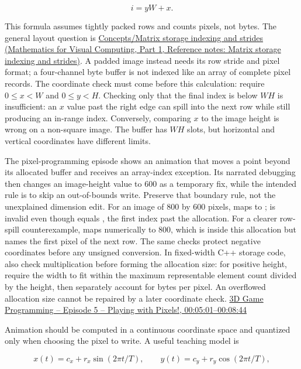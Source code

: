 \[
i=yW+x.
\]

This formula assumes tightly packed rows and counts pixels, not bytes. The general layout question is \href{../02-Mathematics-for-Visual-Computing-P01/main.pdf\#nameddest=appendix-ffdc1d4e5350}{Concepts/Matrix storage indexing and strides (Mathematics for Visual Computing, Part 1, Reference notes: Matrix storage indexing and strides)}. A padded image instead needs its row stride and pixel format; a four-channel byte buffer is not indexed like an array of complete pixel records. The coordinate check must come before this calculation: require \(0\le x<W\) and \(0\le y<H\). Checking only that the final index is below \(WH\) is insufficient: an \(x\) value past the right edge can spill into the next row while still producing an in-range index. Conversely, comparing \(x\) to the image height is wrong on a non-square image. The buffer has \(WH\) slots, but horizontal and vertical coordinates have different limits.

The pixel-programming episode shows an animation that moves a point beyond its allocated buffer and receives an array-index exception. Its narrated debugging then changes an image-height value to 600 as a temporary fix, while the intended rule is to skip an out-of-bounds write. Preserve that boundary rule, not the unexplained dimension edit. For an image of 800 by 600 pixels,  maps to ;  is invalid even though  equals , the first index past the allocation. For a clearer row-spill counterexample,  maps numerically to 800, which is inside this allocation but names the first pixel of the next row. The same checks protect negative coordinates before any unsigned conversion. In fixed-width C++ storage code, also check multiplication before forming the allocation size: for positive height, require the width to fit within the maximum representable element count divided by the height, then separately account for bytes per pixel. An overflowed allocation size cannot be repaired by a later coordinate check. \href{https://www.youtube.com/watch?v=dwn_UrItwfw&t=301s}{3D Game Programming -- Episode 5 -- Playing with Pixels!, 00:05:01--00:08:44}

Animation should be computed in a continuous coordinate space and quantized only when choosing the pixel to write. A useful teaching model is

\[
x(t)=c_x+r_x\sin(2\pi t/T),\qquad y(t)=c_y+r_y\cos(2\pi t/T),
\]

